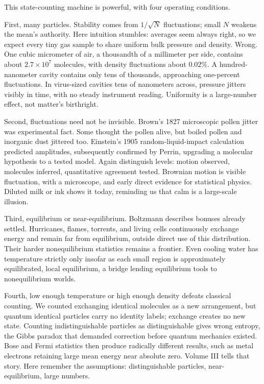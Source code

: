 
This state-counting machine is powerful, with four operating conditions.

First, many particles. Stability comes from \(1/\sqrt{N}\) fluctuations; small \(N\) weakens the mean's authority. Here intuition stumbles: averages seem always right, so we expect every tiny gas sample to share uniform bulk pressure and density. Wrong. One cubic micrometer of air, a thousandth of a millimeter per side, contains about \(2.7\times10^{7}\) molecules, with density fluctuations about \(0.02\%\). A hundred-nanometer cavity contains only tens of thousands, approaching one-percent fluctuations. In virus-sized cavities tens of nanometers across, pressure jitters visibly in time, with no steady instrument reading. Uniformity is a large-number effect, not matter's birthright.

Second, fluctuations need not be invisible. Brown's 1827 microscopic pollen jitter was experimental fact. Some thought the pollen alive, but boiled pollen and inorganic dust jittered too. Einstein's 1905 random-liquid-impact calculation predicted amplitudes, subsequently confirmed by Perrin, upgrading a molecular hypothesis to a tested model. Again distinguish levels: motion observed, molecules inferred, quantitative agreement tested. Brownian motion is visible fluctuation, with a microscope, and early direct evidence for statistical physics. Diluted milk or ink shows it today, reminding us that calm is a large-scale illusion.

Third, equilibrium or near-equilibrium. Boltzmann describes bonuses already settled. Hurricanes, flames, torrents, and living cells continuously exchange energy and remain far from equilibrium, outside direct use of this distribution. Their harder nonequilibrium statistics remains a frontier. Even cooling water has temperature strictly only insofar as each small region is approximately equilibrated, local equilibrium, a bridge lending equilibrium tools to nonequilibrium worlds.

Fourth, low enough temperature or high enough density defeats classical counting. We counted exchanging identical molecules as a new arrangement, but quantum identical particles carry no identity labels; exchange creates no new state. Counting indistinguishable particles as distinguishable gives wrong entropy, the Gibbs paradox that demanded correction before quantum mechanics existed. Bose and Fermi statistics then produce radically different results, such as metal electrons retaining large mean energy near absolute zero. Volume III tells that story. Here remember the assumptions: distinguishable particles, near-equilibrium, large numbers.

